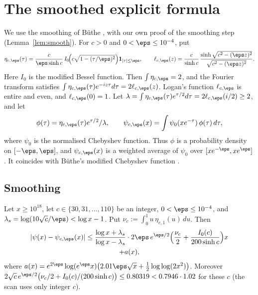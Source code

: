 \section{The smoothed explicit formula}\label{sec:explicit}

We use the smoothing of B\"uthe \cite{Buthe2016}, with our own proof of the smoothing step (Lemma~\ref{lem:smooth}).
For $c > 0$ and $0 < \eps \le 10^{-4}$, put
\[
\eta_{c,\eps}(\tau) = \frac{c}{\eps\sinh c}\, I_0\!\Big(c\sqrt{1 - (\tau/\eps)^2}\Big)\mathbf 1_{|\tau|\le\eps},
\qquad
\ell_{c,\eps}(z) = \frac{c}{\sinh c}\,\frac{\sinh\sqrt{c^2 - (\eps z)^2}}{\sqrt{c^2-(\eps z)^2}} .
\]
Here $I_0$ is the modified Bessel function.
Then $\int\eta_{c,\eps} = 2$, and the Fourier transform satisfies $\int \eta_{c,\eps}(\tau)e^{-i z\tau}d\tau = 2\ell_{c,\eps}(z)$.
Logan's function $\ell_{c,\eps}$ is entire and even, and $\ell_{c,\eps}(0) = 1$.
Let $\lambda = \int\eta_{c,\eps}(\tau)e^{\tau/2}d\tau = 2\ell_{c,\eps}(i/2) \ge 2$, and let
\begin{equation}\label{eq:phi}
\phi(\tau) = \eta_{c,\eps}(\tau)e^{\tau/2}/\lambda, \qquad \psi_{c,\eps}(x) = \int \psi_0(xe^{-\tau})\,\phi(\tau)\,d\tau,
\end{equation}
where $\psi_0$ is the normalised Chebyshev function.
Thus $\phi$ is a probability density on $[-\eps,\eps]$, and $\psi_{c,\eps}(x)$ is a weighted average of $\psi_0$ over $[xe^{-\eps}, xe^{\eps}]$.
It coincides with B\"uthe's modified Chebyshev function \cite[(3.2)--(3.4)]{Buthe2018}.

\subsection{Smoothing}
\begin{lemma}\label{lem:smooth}
Let $x \ge 10^{18}$, let $c\in\{30,31,\dots,110\}$ be an integer, $0 < \eps \le 10^{-4}$, and $\lambda_s = \log(10\sqrt c/\eps) < \log x - 1$.
Put $\nu_c := \int_0^1 u\,\eta_{c,1}(u)\,du$. Then
\begin{multline*}
|\psi(x) - \psi_{c,\eps}(x)| \le \frac{\log x + \lambda_s}{\log x - \lambda_s}\cdot 2\eps\, e^{\eps/2}\Big(\frac{\nu_c}{2} + \frac{I_0(c)}{200\sinh c}\Big)x \\ + a(x),
\end{multline*}
where $a(x) = e^{2\eps}\log(e^{\eps}x)\big(2.01\eps\sqrt x + \tfrac12\log\log(2x^2)\big)$.
Moreover $2\sqrt c\,e^{\eps/2}\big(\nu_c/2 + I_0(c)/(200\sinh c)\big) \le 0.80319 < 0.7946\cdot 1.02$ for these $c$ (the scan uses only integer $c$).
\end{lemma}

